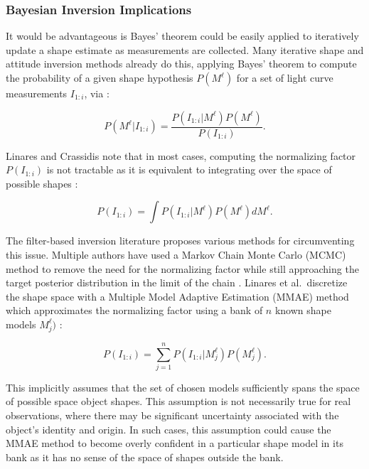 \subsubsection{Bayesian Inversion Implications}

It would be advantageous is Bayes' theorem could be easily applied to iteratively update a shape estimate as measurements are collected. Many iterative shape and attitude inversion methods already do this, applying Bayes' theorem to compute the probability of a given shape hypothesis $P(M^\ell)$ for a set of light curve measurements $I_{1:i}$, via \cite{linares2018space}:

\begin{equation}
  P(M^\ell \vert I_{1:i}) = \frac{P(I_{1:i} \vert M^\ell)P(M^\ell)}{P(I_{1:i})}.
\end{equation}

Linares and Crassidis note that in most cases, computing the normalizing factor $P(I_{1:i})$ is not tractable as it is equivalent to integrating over the space of possible shapes \cite{linares2018space}:

\begin{equation}
  P(I_{1:i}) = \int P(I_{1:i} \vert M^\ell)P(M^\ell) dM^\ell.
\end{equation}

The filter-based inversion literature proposes various methods for circumventing this issue. Multiple authors have used a Markov Chain Monte Carlo (MCMC) method to remove the need for the normalizing factor while still approaching the target posterior distribution in the limit of the chain \cite{linares2018space, campbell2023}. Linares et al.\ discretize the shape space with a Multiple Model Adaptive Estimation (MMAE) method which approximates the normalizing factor using a bank of $n$ known shape models $M^\ell_j)$ \cite{linares2014space}:

\begin{equation}
  P(I_{1:i}) = \sum_{j=1}^n P(I_{1:i} \vert M^\ell_j)P(M^\ell_j).
\end{equation}

This implicitly assumes that the set of chosen models sufficiently spans the space of possible space object shapes. This assumption is not necessarily true for real observations, where there may be significant uncertainty associated with the object's identity and origin. In such cases, this assumption could cause the MMAE method to become overly confident in a particular shape model in its bank as it has no sense of the space of shapes outside the bank.

